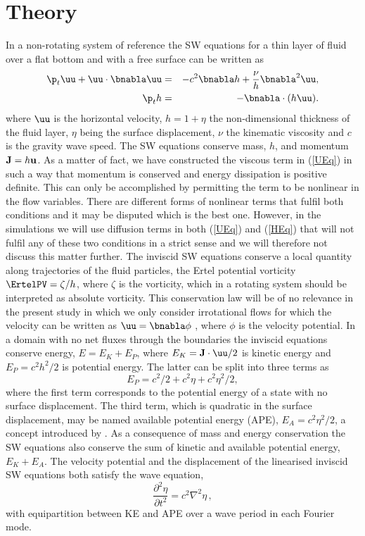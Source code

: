 \section{Theory}

In a non-rotating system of reference the SW equations for a thin layer of fluid over a flat bottom and with a free
surface can be written as  \cite[see for example][]{VallisLIVRE2006}
\begin{eqnarray} \label{UEq}
\p_t \uu + \uu\cdot \bnabla  \uu   
&=& - c^2 \bnabla h + \frac{\nu}{h}  \bnabla^2 \uu,   \label{eq_uu}\\ \label{HEq}
\p_t   h    &=& - \bnabla \cdot (h \uu).  \label{eq_h}
\end{eqnarray}
where $\uu$ is the horizontal velocity, %
$h = 1 + \eta $ the non-dimensional thickness of the fluid layer,  $ \eta $ being the surface displacement, 
$\nu$ the kinematic viscosity and $ c $ is the gravity wave speed. The SW equations conserve mass, $ h $, and momentum $ {\bf J} = h{\bf u} $. As a matter of fact, we have constructed the viscous term in (\ref{UEq}) in such a way that momentum is conserved and energy dissipation is positive definite. This can only be accomplished by permitting the term to be nonlinear in the flow variables. There are different forms of nonlinear terms that fulfil both conditions and it may be disputed which is the best one. However, in the simulations we will use diffusion terms in both (\ref{UEq}) and (\ref{HEq}) that will not fulfil any of these two conditions in a strict sense and we will therefore not discuss this matter further. The inviscid SW equations conserve a local
quantity along trajectories of the fluid particles, the Ertel
potential vorticity $\ErtelPV = \zeta /h$, where $\zeta  $ is the vorticity, which in a rotating system should be interpreted as absolute vorticity.  This conservation law will be of no relevance in the present study in which we only consider
irrotational flows for which the velocity can be written as $ \uu = \bnabla \phi $ , where $ \phi $ is the velocity potential. In a domain with no net fluxes through the boundaries the inviscid equations conserve energy, $ E = E_K + E_P $, where $ E_K =   {\bf J}  \cdot {\uu} /2 $ is kinetic energy and $ E_P = c^{2} h^2/2 $ is potential energy. The latter can be split into three terms as \begin{equation}
E_P = c^2/2 + c^2\eta+ c^2 \eta^2/2, 
\end{equation}
where the first term corresponds to the potential energy of a state with no
surface displacement.  The third term, which is quadratic in the surface displacement, may be named available potential energy (APE),
$E_A = c^2\eta^2/2$, a concept introduced by  \cite{Lorenz1955}. As a consequence of mass and energy conservation the SW equations also conserve the sum of kinetic and available potential energy, $ E_K + E_A $.
 The velocity potential and the displacement of the linearised inviscid SW equations both satisfy the wave equation,
\begin{equation}
\frac{\partial ^2 \eta}{\partial t^2} = c^2 \nabla^2 \eta \, ,
\end{equation}
with equipartition between KE and APE over a wave period in each Fourier mode.

